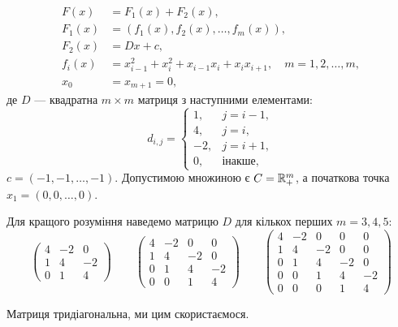 \begin{equation}
    \begin{aligned}
        F(x) &= F_1(x) + F_2(x), \\
        F_1(x) &= (f_1(x), f_2(x), \dots, f_m(x)), \\
        F_2(x) &= D x + c, \\
        f_i(x) &= x_{i - 1}^2 + x_i^2 + x_{i - 1} x_i + x_i x_{i + 1}, \quad m = 1, 2, \dots, m, \\
        x_0 &= x_{m + 1} = 0,
    \end{aligned}
\end{equation}
де $D$ --- квадратна $m \times m$ матриця з наступними елементами:
\begin{equation}
    d_{i,j} = \begin{cases}
         1, & j = i - 1, \\
         4, & j = i, \\
        -2, & j = i + 1, \\
         0, & \text{інакше},
    \end{cases}
\end{equation}
$c = (-1, -1, \dots, -1)$. Допустимою множиною є $C = \mathbb{R}_+^m$, а початкова точка $x_1 = (0, 0, \dots, 0)$. \medskip

Для кращого розуміння наведемо матрицю $D$ для кількох перших $m = 3, 4, 5$:
\begin{equation}
    \begin{pmatrix}
        4 & -2 &  0 \\
        1 &  4 & -2 \\
        0 &  1 &  4
    \end{pmatrix}
    \qquad
    \begin{pmatrix}
        4 & -2 &  0 &  0 \\
        1 &  4 & -2 &  0 \\
        0 &  1 &  4 & -2 \\
        0 &  0 &  1 &  4
    \end{pmatrix}
    \qquad
    \begin{pmatrix}
        4 & -2 &  0 &  0 &  0 \\
        1 &  4 & -2 &  0 &  0 \\
        0 &  1 &  4 & -2 &  0 \\
        0 &  0 &  1 &  4 & -2 \\
        0 &  0 &  0 &  1 &  4
    \end{pmatrix}
\end{equation}

\begin{remark}
    Матриця тридіагональна, ми цим скористаємося.
\end{remark}
